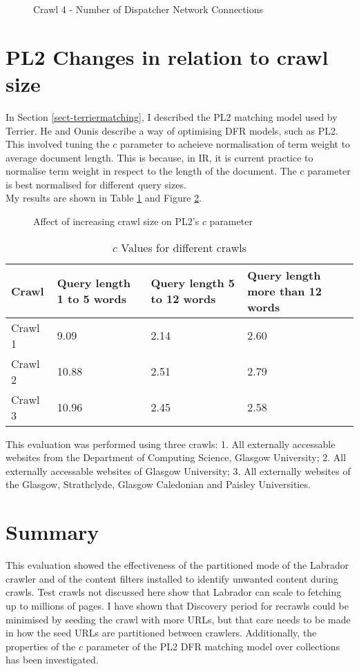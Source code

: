 \begin{figure}[h]
  \centerline{
   }
\label{fig-crawl4_connections}
\caption{Crawl 4 - Number of Dispatcher Network Connections}
\end{figure}

\section{PL2 Changes in relation to crawl size}\label{sect-evalpl2}
In Section \ref{sect-terriermatching}, I described the PL2 matching model used by Terrier. He and Ounis describe\cite{ref13} a way of optimising DFR models, such as PL2. This involved tuning the $c$ parameter to acheieve normalisation of term weight to average document length. This is because, in IR, it is current practice to normalise term weight in respect to the length of the document. The c parameter is best normalised for different query sizes.\\
My results are shown in Table \ref{tbl-pl2values} and Figure \ref{fig-pl2}.
\begin{figure}[h]
  \centerline{
   }
\label{fig-pl2}
\caption{Affect of increasing crawl size on PL2's $c$ parameter}
\end{figure}
\begin{center}
\begin{table}
\begin{tabular}{|l|l|l|l|}
\hline
\bf{Crawl} & \bf{Query length 1 to 5 words} & \bf{Query length 5 to 12 words} & \bf{Query length more than 12 words} \\
\hline
Crawl 1 & 9.09 & 2.14 & 2.60 \\
\hline
Crawl 2 & 10.88 & 2.51 & 2.79 \\
\hline
Crawl 3 & 10.96 & 2.45 & 2.58 \\
\hline
\end{tabular}
\label{tbl-pl2values}\caption{$c$ Values for different crawls}
\end{table}
\end{center}
This evaluation was performed using three crawls: 1. All externally accessable websites from the Department of Computing Science, Glasgow University; 2. All externally accessable websites of Glasgow University; 3. All externally websites of the Glasgow, Strathclyde, Glasgow Caledonian and Paisley Universities.

\section{Summary}
This evaluation showed the effectiveness of the partitioned mode of the Labrador crawler and of the content filters installed to identify unwanted content during crawls. Test crawls not discussed here show that Labrador can scale to fetching up to millions of pages. I have shown that Discovery period for recrawls could be minimised by seeding the crawl with more URLs, but that care needs to be made in how the seed URLs are partitioned between crawlers. Additionally, the properties of the $c$ parameter of the PL2 DFR matching model over collections has been investigated.
